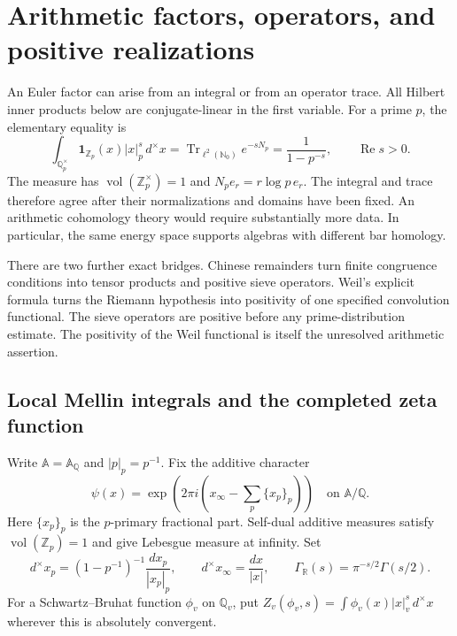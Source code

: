 \section{Arithmetic factors, operators, and positive realizations}
\label{syn-arith:section}

An Euler factor can arise from an integral or from an operator trace.
All Hilbert inner products below are conjugate-linear in the first variable.
For a prime $p$, the elementary equality is
\begin{equation}
 \int_{\mathbb Q_p^\times}\mathbf1_{\mathbb Z_p}(x)|x|_p^s\,d^\times x
 =\operatorname{Tr}_{\ell^2(\mathbb N_0)}e^{-sN_p}
 =\frac1{1-p^{-s}},\qquad \operatorname{Re}s>0.
 \label{syn-arith:spine-local}
\end{equation}
The measure has $\operatorname{vol}(\mathbb Z_p^\times)=1$ and
$N_pe_r=r\log p\,e_r$.  The integral and trace therefore agree after
their normalizations and domains have been fixed.
An arithmetic cohomology theory would require substantially more data.
In particular, the same energy space supports algebras with different bar homology.

There are two further exact bridges.  Chinese remainders turn finite
congruence conditions into tensor products and positive sieve operators.
Weil's explicit formula turns the Riemann hypothesis into positivity of
one specified convolution functional.  The sieve operators are positive
before any prime-distribution estimate.  The positivity of the Weil
functional is itself the unresolved arithmetic assertion.

\subsection{Local Mellin integrals and the completed zeta function}
\label{syn-arith:tate}

Write $\mathbb A=\mathbb A_{\mathbb Q}$ and $|p|_p=p^{-1}$.
Fix the additive character
\[
 \psi(x)=\exp\left(2\pi i\left(x_\infty-
                  \sum_p\{x_p\}_p\right)\right)
 \quad\text{on }\mathbb A/\mathbb Q.
\]
Here $\{x_p\}_p$ is the $p$-primary fractional part.
Self-dual additive measures satisfy $\operatorname{vol}(\mathbb Z_p)=1$
and give Lebesgue measure at infinity.  Set
\[
 d^\times x_p=(1-p^{-1})^{-1}\frac{dx_p}{|x_p|_p},\qquad
 d^\times x_\infty=\frac{dx}{|x|},\qquad
 \Gamma_{\mathbb R}(s)=\pi^{-s/2}\Gamma(s/2).
\]
For a Schwartz--Bruhat function $\phi_v$ on $\mathbb Q_v$, put
$Z_v(\phi_v,s)=\int\phi_v(x)|x|_v^s\,d^\times x$ wherever this is absolutely convergent.

